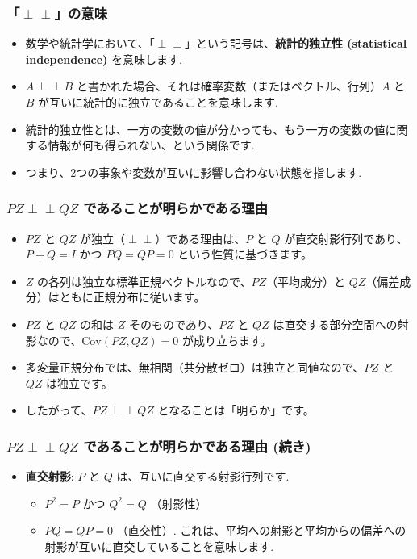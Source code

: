 \documentclass[aspectratio=169]{beamer}
\begin{document}
\begin{frame}
\frametitle{「$\perp\perp$」の意味}
\begin{itemize}
    \item 数学や統計学において、「$\perp\perp$」という記号は、\textbf{統計的独立性 (statistical independence)} を意味します.
    \item $A\perp\perp B$ と書かれた場合、それは確率変数（またはベクトル、行列）$A$ と $B$ が互いに統計的に独立であることを意味します.
    \item 統計的独立性とは、一方の変数の値が分かっても、もう一方の変数の値に関する情報が何も得られない、という関係です.
    \item つまり、2つの事象や変数が互いに影響し合わない状態を指します.
\end{itemize}
\end{frame}

\begin{frame}
\frametitle{$PZ\perp\perp QZ$ であることが明らかである理由}
\begin{itemize}
    \item $PZ$ と $QZ$ が独立（$\perp\perp$）である理由は、$P$ と $Q$ が直交射影行列であり、$P+Q=I$ かつ $PQ=QP=0$ という性質に基づきます。
    \item $Z$ の各列は独立な標準正規ベクトルなので、$PZ$（平均成分）と $QZ$（偏差成分）はともに正規分布に従います。
    \item $PZ$ と $QZ$ の和は $Z$ そのものであり、$PZ$ と $QZ$ は直交する部分空間への射影なので、$\mathrm{Cov}(PZ, QZ) = 0$ が成り立ちます。
    \item 多変量正規分布では、無相関（共分散ゼロ）は独立と同値なので、$PZ$ と $QZ$ は独立です。
    \item したがって、$PZ \perp\perp QZ$ となることは「明らか」です。
\end{itemize}
\end{frame}

\begin{frame}
\frametitle{$PZ\perp\perp QZ$ であることが明らかである理由 (続き)}
\begin{itemize}
    \item \textbf{直交射影}: $P$ と $Q$ は、互いに直交する射影行列です.
    \begin{itemize}
        \item $P^2=P$ かつ $Q^2=Q$ （射影性）
        \item $PQ=QP=0$ （直交性）. これは、平均への射影と平均からの偏差への射影が互いに直交していることを意味します.
    \end{itemize}
\end{itemize}
\end{frame}
\end{document}
